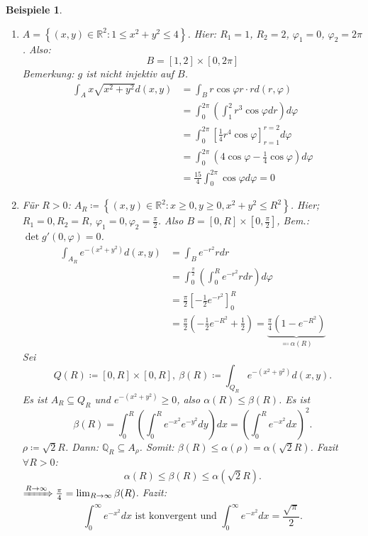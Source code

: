 \documentclass[12pt]{extreport} %
\newcommand{\Q}{\mathbb{Q}}
\newcommand{\R}{\mathbb{R}}
\theoremstyle{named}
\theoremstyle{nnamed}
\theoremstyle{itshape}
\theoremstyle{normal}
\newtheorem*{beispiele}{Beispiele}
\begin{document}
\begin{beispiele} ~\
	\begin{enumerate}
		\item $A = \left\{ (x,y) \in \R^{2} \colon 1 \leq x^{2} + y^{2} \leq 4 \right\}$. Hier: $R_{1} = 1$, $R_{2} = 2$, $\varphi_{1} = 0$, $\varphi_{2} = 2\pi$. Also: 
			$$ B = [1, 2] \times [0, 2\pi] $$
			Bemerkung: $g$ ist nicht injektiv auf $B$.
			\begin{align*}
				\int_{A} x \sqrt{x^{2} + y^{2}} d(x, y) & = \int_{B} r \cos \varphi r \cdot r d(r, \varphi) \\
				& = \int_{0}^{2\pi} \left( \int_{1}^{2} r^{3} \cos \varphi dr \right) d\varphi \\
				& = \int_{0}^{2\pi} \left[ \frac{1}{4} r^{4} \cos \varphi \right]_{r=1}^{r=2} d\varphi \\
				& = \int_{0}^{2\pi} \left( 4 \cos \varphi - \frac{1}{4} \cos \varphi \right) d\varphi \\
				&= \frac{15}{4} \int_{0}^{2\pi} \cos \varphi d\varphi = 0
			\end{align*}
		\item Für $R > 0$: $A_{R} \coloneqq \left\{ (x,y) \in \R^{2} \colon x \geq 0, y \geq 0, x^{2} + y^{2} \leq R^{2} \right\}$. Hier; $R_{1} = 0, R_{2} = R$, $\varphi_{1} = 0, \varphi_{2} = \frac{\pi}{2}$. Also $B = [0, R] \times \left[ 0, \frac{\pi}{2} \right]$, Bem.: $\det g'(0, \varphi) = 0$.
			\begin{align*}
				\int_{A_{R}} e^{-(x^{2} + y^{2})} d(x,y) & = \int_{B} e^{-r^{2}} r dr \\
				& = \int_{0}^{\frac{\pi}{2}} \left( \int_{0}^{R} e^{-r^{2}} r dr \right) d\varphi \\
				& = \frac{\pi}{2} \left[ -\frac{1}{2} e^{-r^{2}} \right]_{0}^{R} \\
				& = \frac{\pi}{2} \left(-\frac{1}{2} e^{-R^{2}} + \frac{1}{2} \right) = \underbrace{\frac{\pi}{4} \left( 1 - e^{-R^{2}} \right)}_{\eqqcolon \alpha(R)}
			\end{align*}
			Sei
			$$Q(R) \coloneqq [0, R] \times [0, R], ~ \beta(R) \coloneqq \int_{Q_{R}} e^{-(x^{2} + y^{2})} d(x, y). $$
			Es ist $A_{R} \subseteq Q_{R}$ und $e^{-(x^{2} + y^{2})} \geq 0$, also $\alpha(R) \leq \beta(R)$. Es ist
			$$ \beta(R) = \int_{0}^{R} \left( \int_{0}^{R} e^{-x^{2}} e^{-y^{2}} dy \right) dx = \left( \int_{0}^{R} e^{-x^{2}} dx \right)^{2}. $$
			$\rho \coloneqq \sqrt{2} R$. Dann: $\Q_{R} \subseteq A_{\rho}$. Somit: $\beta(R) \leq \alpha(\rho) = \alpha \left( \sqrt{2} R \right)$. Fazit $\forall R > 0$: 
			$$ \alpha(R) \leq \beta(R) \leq \alpha\left( \sqrt{2} R \right). $$
			$\xRightarrow[]{R \rightarrow \infty} \frac{\pi}{4} = \lim_{R \rightarrow \infty} \beta(R)$. Fazit:
			$$ \int_{0}^{\infty} e^{-x^{2}} dx \text{ ist konvergent und } \int_{0}^{\infty} e^{-x^{2}} dx = \frac{\sqrt{\pi}}{2}. $$
	\end{enumerate}
\end{beispiele}
\end{document}
